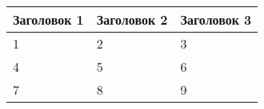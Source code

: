 \documentclass{article}
\begin{document}
\begin{tabular}{|l|l|l|}
\hline
Заголовок 1 & Заголовок 2 & Заголовок 3 \\
\hline
1 & 2 & 3 \\
\hline
4 & 5 & 6 \\
\hline
7 & 8 & 9 \\
\hline
\end{tabular}
\end{document}
